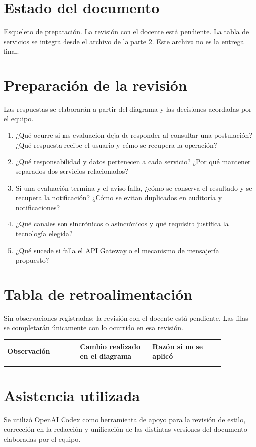 \section*{Estado del documento}
Esqueleto de preparación. La revisión con el docente está pendiente. La tabla de servicios se integra desde el archivo de la parte 2. Este archivo no es la entrega final.

\section*{Preparación de la revisión}
Las respuestas se elaborarán a partir del diagrama y las decisiones acordadas por el equipo.
\begin{enumerate}
\item ¿Qué ocurre si ms-evaluacion deja de responder al consultar una postulación? ¿Qué respuesta recibe el usuario y cómo se recupera la operación?
\item ¿Qué responsabilidad y datos pertenecen a cada servicio? ¿Por qué mantener separados dos servicios relacionados?
\item Si una evaluación termina y el aviso falla, ¿cómo se conserva el resultado y se recupera la notificación? ¿Cómo se evitan duplicados en auditoría y notificaciones?
\item ¿Qué canales son sincrónicos o asincrónicos y qué requisito justifica la tecnología elegida?
\item ¿Qué sucede si falla el API Gateway o el mecanismo de mensajería propuesto?
\end{enumerate}

\section*{Tabla de retroalimentación}
Sin observaciones registradas: la revisión con el docente está pendiente. Las filas se completarán únicamente con lo ocurrido en esa revisión.

\begin{center}
\renewcommand{\arraystretch}{1.4}
\begin{tabular}{|p{0.29\linewidth}|p{0.29\linewidth}|p{0.29\linewidth}|}
\hline
\textbf{Observación} & \textbf{Cambio realizado en el diagrama} & \textbf{Razón si no se aplicó} \\
\hline
\rule{0pt}{2cm} & & \\
\hline
\end{tabular}
\end{center}

\section*{Asistencia utilizada}
Se utilizó OpenAI Codex como herramienta de apoyo para la revisión de estilo, corrección en la redacción y unificación de las distintas versiones del documento elaboradas por el equipo.
